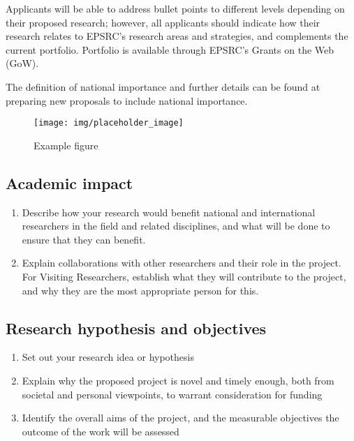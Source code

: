 \documentclass{epsrc}
\begin{document}
Applicants will be able to address bullet points to different levels depending on their proposed research; however, all applicants should indicate how their research relates to EPSRC's research areas and strategies, and complements the current portfolio. Portfolio is available through EPSRC's Grants on the Web (GoW).

The definition of national importance and further details can be found at preparing new proposals to include national importance.


\begin{figure}[!htbp]
	\begin{center}
		\texttt{[image: img/placeholder\_image]}
		\vspace{-30pt}
		\caption{Example figure}
		\label{fig:full}
	\end{center}
\end{figure}



\subsection{Academic impact}

\begin{enumerate}[label=\bfseries \arabic*:, align=left]
	\item Describe how your research would benefit national and international researchers in the field and related disciplines, and what will be done to ensure that they can benefit.
	\item Explain collaborations with other researchers and their role in the project. For Visiting Researchers, establish what they will contribute to the project, and why they are the most appropriate person for this.
\end{enumerate}

\subsection{Research hypothesis and objectives}

\begin{enumerate}[label=\bfseries Objective \arabic*:, align=left]
	\item Set out your research idea or hypothesis
	\item Explain why the proposed project is novel and timely enough, both from societal and personal viewpoints, to warrant consideration for funding
	\item Identify the overall aims of the project, and the measurable objectives the outcome of the work will be assessed
\end{enumerate}
\end{document}
